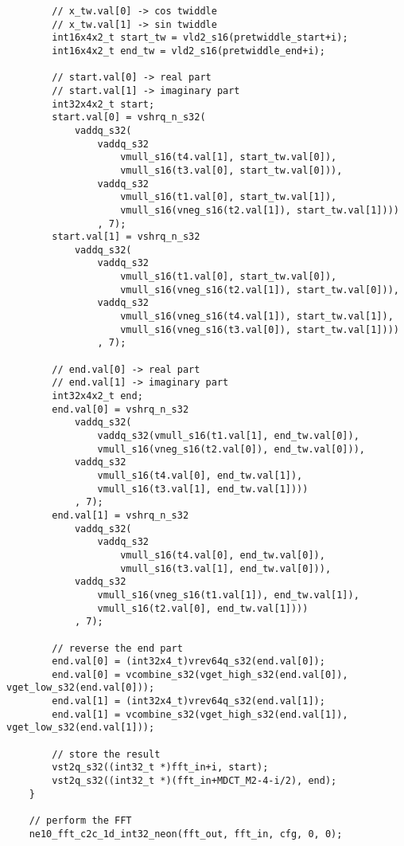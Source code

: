 \documentclass{article}
\begin{document}
\begin{lstlisting}
        // x_tw.val[0] -> cos twiddle
        // x_tw.val[1] -> sin twiddle
        int16x4x2_t start_tw = vld2_s16(pretwiddle_start+i);
        int16x4x2_t end_tw = vld2_s16(pretwiddle_end+i);

        // start.val[0] -> real part
        // start.val[1] -> imaginary part
        int32x4x2_t start;
        start.val[0] = vshrq_n_s32(
            vaddq_s32(
                vaddq_s32
                    vmull_s16(t4.val[1], start_tw.val[0]),
                    vmull_s16(t3.val[0], start_tw.val[0])),
                vaddq_s32
                    vmull_s16(t1.val[0], start_tw.val[1]),
                    vmull_s16(vneg_s16(t2.val[1]), start_tw.val[1])))
                , 7);
        start.val[1] = vshrq_n_s32
            vaddq_s32(
                vaddq_s32
                    vmull_s16(t1.val[0], start_tw.val[0]),
                    vmull_s16(vneg_s16(t2.val[1]), start_tw.val[0])),
                vaddq_s32
                    vmull_s16(vneg_s16(t4.val[1]), start_tw.val[1]),
                    vmull_s16(vneg_s16(t3.val[0]), start_tw.val[1])))
                , 7);

        // end.val[0] -> real part
        // end.val[1] -> imaginary part
        int32x4x2_t end;
        end.val[0] = vshrq_n_s32
            vaddq_s32(
                vaddq_s32(vmull_s16(t1.val[1], end_tw.val[0]),
                vmull_s16(vneg_s16(t2.val[0]), end_tw.val[0])),
            vaddq_s32
                vmull_s16(t4.val[0], end_tw.val[1]),
                vmull_s16(t3.val[1], end_tw.val[1])))
            , 7);
        end.val[1] = vshrq_n_s32
            vaddq_s32(
                vaddq_s32
                    vmull_s16(t4.val[0], end_tw.val[0]),
                    vmull_s16(t3.val[1], end_tw.val[0])),
            vaddq_s32
                vmull_s16(vneg_s16(t1.val[1]), end_tw.val[1]),
                vmull_s16(t2.val[0], end_tw.val[1])))
            , 7);

        // reverse the end part
        end.val[0] = (int32x4_t)vrev64q_s32(end.val[0]);
        end.val[0] = vcombine_s32(vget_high_s32(end.val[0]), vget_low_s32(end.val[0]));
        end.val[1] = (int32x4_t)vrev64q_s32(end.val[1]);
        end.val[1] = vcombine_s32(vget_high_s32(end.val[1]), vget_low_s32(end.val[1]));

        // store the result
        vst2q_s32((int32_t *)fft_in+i, start);
        vst2q_s32((int32_t *)(fft_in+MDCT_M2-4-i/2), end);
    }

    // perform the FFT
    ne10_fft_c2c_1d_int32_neon(fft_out, fft_in, cfg, 0, 0);


\end{lstlisting}
\end{document}
